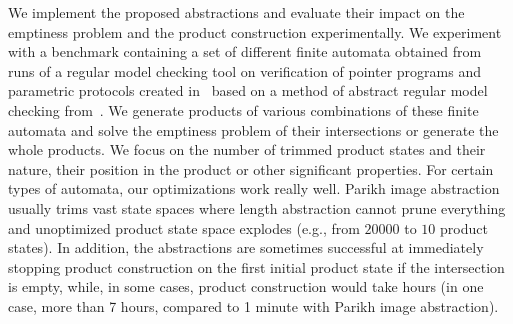 We implement the proposed abstractions and evaluate their impact on the emptiness problem and the product construction experimentally. We experiment with a benchmark containing a set of different finite automata obtained from runs of a regular model checking tool on verification of pointer programs and parametric protocols created in~\cite{model_checking_tool_10.1007/978-3-540-70844-5_7} based on a method of abstract regular model checking from~\cite{method_model_checking_tool}. We generate products of various combinations of these finite automata and solve the emptiness problem of their intersections or generate the whole products. We focus on the number of trimmed product states and their nature, their position in the product or other significant properties. For certain types of automata, our optimizations work really well. Parikh image abstraction usually trims vast state spaces where length abstraction cannot prune everything and unoptimized product state space explodes (e.g., from $20000$ to $10$ product states). In addition, the abstractions are sometimes successful at immediately stopping product construction on the first initial product state if the intersection is empty, while, in some cases, product construction would take hours (in one case, more than 7 hours, compared to 1 minute with Parikh image abstraction).

